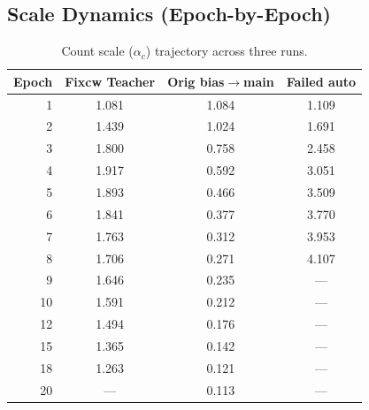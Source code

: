 \documentclass[11pt,a4paper]{article}
\begin{document}
\subsection{Scale Dynamics (Epoch-by-Epoch)}

\begin{table}[h]
\centering
\caption{Count scale ($\alpha_c$) trajectory across three runs.}
\label{tab:scale_trajectory}
\small
\begin{tabular}{r c c c}
\toprule
\textbf{Epoch} & \textbf{Fixcw Teacher} & \textbf{Orig bias$\to$main} & \textbf{Failed auto} \\
\midrule
1 & 1.081 & 1.084 & 1.109 \\
2 & 1.439 & 1.024 & 1.691 \\
3 & 1.800 & 0.758 & 2.458 \\
4 & 1.917 & 0.592 & 3.051 \\
5 & 1.893 & 0.466 & 3.509 \\
6 & 1.841 & 0.377 & 3.770 \\
7 & 1.763 & 0.312 & 3.953 \\
8 & 1.706 & 0.271 & 4.107 \\
9 & 1.646 & 0.235 & --- \\
10 & 1.591 & 0.212 & --- \\
12 & 1.494 & 0.176 & --- \\
15 & 1.365 & 0.142 & --- \\
18 & 1.263 & 0.121 & --- \\
20 & --- & 0.113 & --- \\
\bottomrule
\end{tabular}
\end{table}
\end{document}
